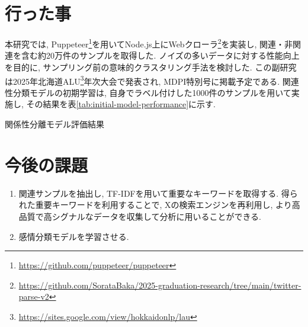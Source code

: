 \documentclass{jabstract}
\begin{document}
\begin{multicols}{2}
\section{行った事}
本研究では, Puppeteer\footnote{\url{https://github.com/puppeteer/puppeteer}}を用いてNode.js上にWebクローラ\footnote{\url{https://github.com/SorataBaka/2025-graduation-research/tree/main/twitter-parse-v2}}を実装し, 関連・非関連を含む約20万件のサンプルを取得した. ノイズの多いデータに対する性能向上を目的に, サンプリング前の意味的クラスタリング手法を検討した. この副研究は2025年北海道ALU\footnote{\url{https://sites.google.com/view/hokkaidonlp/lau}}年次大会で発表され, MDPI特別号に掲載予定である. 関連性分類モデルの初期学習は, 自身でラベル付けした1000件のサンプルを用いて実施し, その結果を表\ref{tab:initial-model-performance}に示す. 
\begin{tablehere}
  \noindent
  \parbox{\linewidth}{
    \centering
    \caption{関係性分離モデル評価結果}\label{tab:initial-model-performance}
  }%
\end{tablehere}
\section{今後の課題}
\begin{enumerate}
\item 関連サンプルを抽出し, TF-IDFを用いて重要なキーワードを取得する. 得られた重要キーワードを利用することで, Xの検索エンジンを再利用し, より高品質で高シグナルなデータを収集して分析に用いることができる.
\item 感情分類モデルを学習させる.
\end{enumerate}
{\small


}



\end{multicols}
\end{document}
